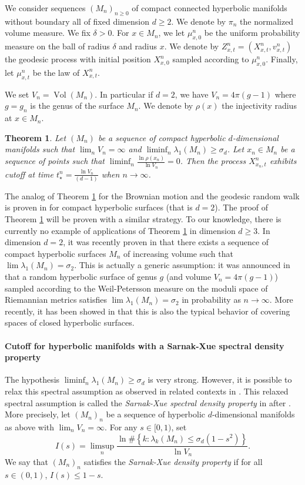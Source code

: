 \documentclass[]{scrartcl}
\DeclareMathOperator{\Vol}{Vol}
\newtheorem{theorem}{Theorem}[section]
\numberwithin{equation}{section}
\numberwithin{figure}{section}
\begin{document}
We consider sequences $(M_n)_{n\geq 0}$ of compact connected hyperbolic manifolds without boundary all of fixed dimension $d \geq 2$. We denote by $\pi_n$ the normalized volume measure. We fix $\delta >0$. For $ x \in M_n$, we let $\mu^n_{x,0}$ be the uniform probability measure on the ball of radius $\delta$ and radius $x$. We denote by $Z^n_{x,t} = (X^n_{x,t},v^n_{x,t})$ the geodesic process with initial position $X^n_{x,0}$ sampled according to $\mu^n_{x,0}$. Finally, let $\mu^n_{x,t}$ be the law of $X^n_{x,t}$.  

We set $V_n = \Vol(M_n)$. In particular if $d = 2$, we have $V_n = 4 \pi (g-1)$ where $g=g_n$ is the genus of the surface $M_n$. We denote by $\rho(x)$ the injectivity radius at $x \in M_n$. 
\begin{theorem}{}\label{th:S1}
	Let $(M_n)$ be a sequence of compact hyperbolic $d$-dimensional manifolds such that $\lim_n V_n = \infty$ and  $\liminf_n \lambda_1(M_n) \geq \sigma_d$. Let $x_n \in M_n$ be a sequence of points such that $\liminf_n \frac{ \ln  \rho(x_n) }{\ln V_n}  = 0$. 
	Then the process $X^n_{x_n,t}$ exhibits cutoff at time $t^n_\star = \frac{\ln V_n}{(d-1)}$ when $n \to \infty$.
\end{theorem}


The analog of Theorem \ref{th:S1} for the Brownian motion and the geodesic random walk is proven in \cite{Golubev} for compact hyperbolic surfaces (that is $d=2$). The proof of Theorem \ref{th:S1} will be proven with a similar strategy. To our knowledge, there is currently no example of applications of Theorem \ref{th:S1} in dimension $d \geq 3$. In dimension $d = 2$, it was recently proven in \cite{MR4635304} that there exists a sequence of compact hyperbolic surfaces $M_n$ of increasing volume such that $\lim \lambda_1(M_n) =\sigma_2$. This is actually a generic assumption: it was announced in \cite{anantharaman2024spectralgaprandomhyperbolic} that a random hyperbolic surface of genus $g$ (and volume $V_n = 4\pi(g-1)$) sampled according to the Weil-Petersson measure on the moduli space of Riemannian metrics satisfies $\lim \lambda_1(M_n) =\sigma_2$ in probability as $n \to \infty$. More recently, it has been showed in \cite{MageePuderVanHandel} that this is also the typical behavior of covering spaces of closed hyperbolic surfaces.


\paragraph{Cutoff for hyperbolic manifolds with a Sarnak-Xue spectral density property}
The hypothesis $\liminf_n \lambda_1(M_n) \geq \sigma_d$ is very strong. However, it is possible to relax this spectral assumption as observed in related contexts in \cite{Golubev,MR4476123,MR4400017}. This relaxed spectral assumption is called the {\em  Sarnak-Xue spectral density property} in  \cite{MR4400017} after \cite{MR1131400}. More precisely, let $(M_n)_n$ be a sequence of hyperbolic $d$-dimensional manifolds as above with $\lim_n V_n = \infty$. For any $s \in [0,1)$, set \[I(s) = \limsup_n \frac{\ln \# \left\lbrace k :    \lambda_k(M_n) \leq \sigma_d (1-s^2)\right\rbrace}{ \ln V_n}.\]
We say that $(M_n)_n$ satisfies the \textit{Sarnak-Xue density property} if for all $s \in (0,1)$, $I(s) \leq 1-s$.
\end{document}
